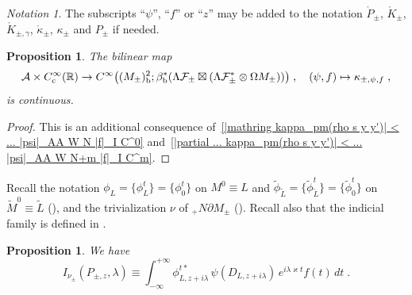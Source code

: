 \documentclass{memo-l}
\theoremstyle{plain}
\newtheorem{prop}[thm]{Proposition}
\theoremstyle{definition}
\theoremstyle{remark}
\newtheorem{notation}[thm]{Notation}
\newcommand{\R}{\mathbb{R}}
\renewcommand{\AA}{\mathcal{A}}
\newcommand{\FF}{\mathcal{F}}
\newcommand{\Cinftyc}{C^\infty_{\text{\rm c}}}
\numberwithin{section}{chapter}
\numberwithin{equation}{section}%
\begin{document}
\begin{notation}\label{n: subscripts psi f z}
The subscripts ``$\psi$'', ``$f$'' or ``$z$'' may be added to the notation $\mathring P_\pm$, $\mathring K_\pm$, $\mathring K_{\pm,\gamma}$, $\mathring\kappa_\pm$, $\kappa_\pm$ and $P_\pm$ if needed.
\end{notation}

\begin{prop}\label{p: (psi f) mapsto kappa_pm psi f is cont}
The bilinear map
\[
\AA\times\Cinftyc(\R)\to C^\infty\big((M_\pm)^2_{\text{\rm b}};\beta_{\text{\rm b}}^*(\Lambda\FF_\pm \boxtimes (\Lambda\FF^*_\pm\otimes \Omega M_\pm))\big)\;,\quad(\psi,f)\mapsto\kappa_{\pm,\psi,f}\;,
\]
is continuous.
\end{prop}

\begin{proof}
This is an additional consequence of~\eqref{|mathring kappa_pm(rho s y y')| < ... |psi|_AA W N |f|_I C^0} and~\eqref{|partial ... kappa_pm(rho s y y')| <  ... |psi|_AA W N+m |f|_I C^m}.
\end{proof}

Recall the notation $\phi_L=\{\phi_L^t\}=\{\phi_0^t\}$ on $M^0\equiv L$ and $\tilde \phi_{\widetilde L}=\{\tilde \phi_{\widetilde L}^t\}=\{\tilde \phi_0^t\}$ on $\widetilde M^0\equiv\widetilde L$ (), and the trivialization $\nu$ of ${}_+N\partial M_\pm$ (). Recall also that the indicial family is defined in .

\begin{prop}\label{p: I_nu(P_pm z lambda))}
We have
\[
I_{\nu_\pm}(P_{\pm,z},\lambda)
\equiv\int_{-\infty}^{+\infty}\phi_{L,z+i\lambda}^{t*}\,\psi(D_{L,z+i\lambda})\,e^{i\lambda\varkappa t}f(t)\,dt\;.
\]
\end{prop}
\end{document}
